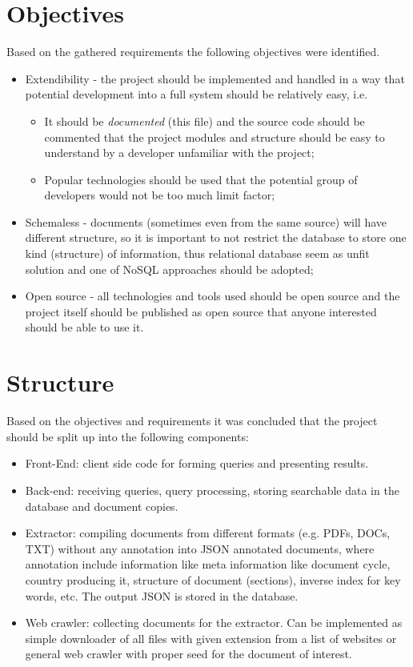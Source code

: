 \documentclass[11pt, a4paper]{report}
\begin{document}
\section{Objectives}
Based on the gathered requirements the following objectives were identified.
\begin{itemize}
  \item Extendibility - the project should be implemented and handled in a way that potential development into a full system should be relatively easy, i.e.
    \begin{itemize}
      \item It should be \emph{documented} (this file) and the source code should be commented that the project modules and structure should be easy to understand by a developer unfamiliar with the project;
      \item Popular technologies should be used that the potential group of developers would not be too much limit factor;
    \end{itemize}
  \item Schemaless - documents (sometimes even from the same source) will have different structure, so it is important to not restrict the database to store one kind (structure) of information, thus relational database seem as unfit solution and one of NoSQL approaches should be adopted;
  \item Open source - all technologies and tools used should be open source and the project itself should be published as open source that anyone interested should be able to use it.
\end{itemize}

\section{Structure}
Based on the objectives and requirements it was concluded that the project should be split up into the following components:
\begin{itemize}
  \item Front-End: client side code for forming queries and presenting results.
  \item Back-end: receiving queries, query processing, storing searchable data in the database and document copies.
  \item Extractor: compiling documents from different formats (e.g. PDFs, DOCs, TXT) without any annotation into JSON annotated documents, where annotation include information like meta information like document cycle, country producing it, structure of document (sections), inverse index for key words, etc. The output JSON is stored in the database.
  \item Web crawler: collecting documents for the extractor. Can be implemented as simple downloader of all files with given extension from a list of websites or general web crawler with proper seed for the document of interest.
\end{itemize}
\end{document}

